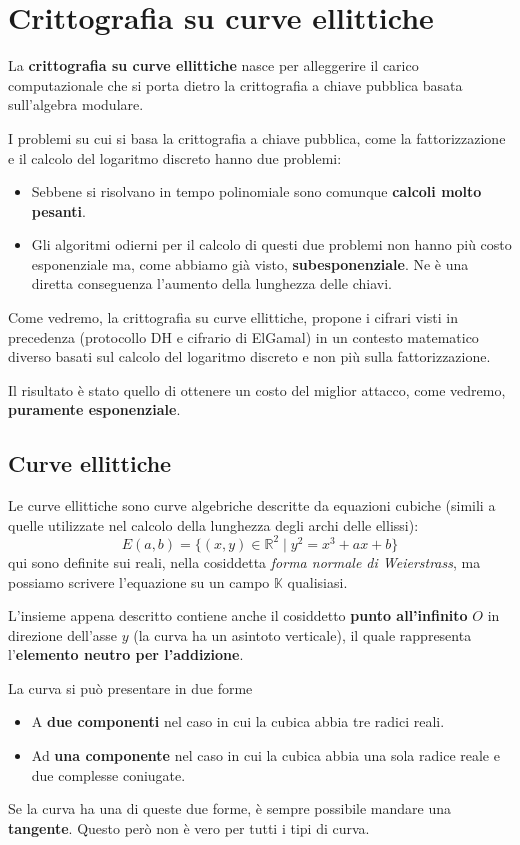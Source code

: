 \chapter{Crittografia su curve ellittiche}
La \textbf{crittografia su curve ellittiche} nasce per alleggerire il carico computazionale che si porta dietro
la crittografia a chiave pubblica basata sull'algebra modulare.

I problemi su cui si basa la crittografia a chiave pubblica, come la fattorizzazione e il calcolo del logaritmo
discreto hanno due problemi:
\begin{itemize}
	\item Sebbene si risolvano in tempo polinomiale sono comunque \textbf{calcoli molto pesanti}.
	\item Gli algoritmi odierni per il calcolo di questi due problemi non hanno pi\`u costo esponenziale ma,
	      come abbiamo gi\`a visto, \textbf{subesponenziale}. Ne \`e una diretta conseguenza l'aumento della
	      lunghezza delle chiavi.
\end{itemize}
Come vedremo, la crittografia su curve ellittiche, propone i cifrari visti in precedenza (protocollo DH e cifrario
di ElGamal) in un contesto matematico diverso basati sul calcolo del logaritmo discreto e non pi\`u sulla
fattorizzazione.

Il risultato \`e stato quello di ottenere un costo del miglior attacco, come vedremo, \textbf{puramente esponenziale}.

\section{Curve ellittiche}
Le curve ellittiche sono curve algebriche descritte da equazioni cubiche (simili a quelle utilizzate nel calcolo
della lunghezza degli archi delle ellissi):
\[ E(a, b) = \{ (x, y) \in \mathbb{R}^2 \mid y^2 = x^3 + ax + b \} \]
qui sono definite sui reali, nella cosiddetta \emph{forma normale di Weierstrass}, ma possiamo scrivere l'equazione
su un campo $\mathbb{K}$ qualisiasi.

L'insieme appena descritto contiene anche il cosiddetto \textbf{punto all'infinito} $O$ in direzione dell'asse $y$
(la curva ha un asintoto verticale), il quale rappresenta l'\textbf{elemento neutro per l'addizione}.

La curva si pu\`o presentare in due forme
\begin{itemize}
	\item A \textbf{due componenti} nel caso in cui la cubica abbia tre radici reali.
	\item Ad \textbf{una componente} nel caso in cui la cubica abbia una sola radice reale e due complesse
	      coniugate.
\end{itemize}
Se la curva ha una di queste due forme, \`e sempre possibile mandare una \textbf{tangente}. Questo per\`o non \`e
vero per tutti i tipi di curva.

